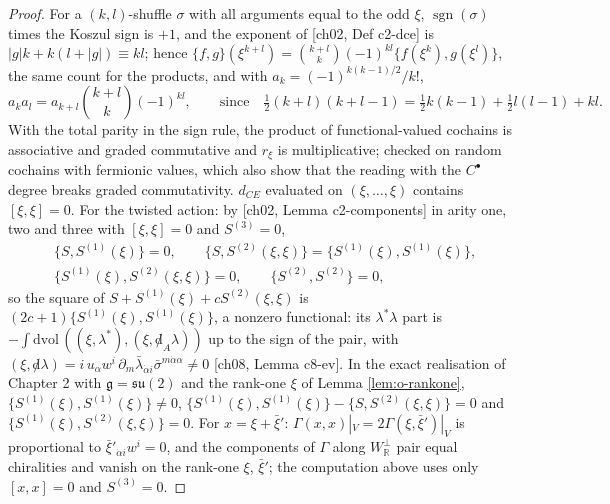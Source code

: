 \begin{proof}
For a $(k,l)$-shuffle $\sigma$ with all arguments equal to the odd $\xi$, $\operatorname{sgn}(\sigma)$ times the Koszul sign is $+1$, and the exponent of [ch02, Def c2-dce] is $|g|k+k(l+|g|)\equiv kl$; hence $\{f,g\}(\xi^{k+l})=\binom{k+l}{k}(-1)^{kl}\{f(\xi^k),g(\xi^l)\}$, the same count for the products, and with $a_k=(-1)^{k(k-1)/2}/k!$,
\[
a_ka_l=a_{k+l}\binom{k+l}{k}(-1)^{kl},\qquad\text{since}\quad \tfrac12(k+l)(k+l-1)=\tfrac12k(k-1)+\tfrac12l(l-1)+kl .
\]
With the total parity in the sign rule, the product of functional-valued cochains is associative and graded commutative and $r_\xi$ is multiplicative; checked on random cochains with fermionic values, which also show that the reading with the $C^\bullet$ degree breaks graded commutativity. $d_{CE}$ evaluated on $(\xi,\dots,\xi)$ contains $[\xi,\xi]=0$. For the twisted action: by [ch02, Lemma c2-components] in arity one, two and three with $[\xi,\xi]=0$ and $S^{(3)}=0$,
\[
\begin{aligned}
&\{S,S^{(1)}(\xi)\}=0,\qquad \{S,S^{(2)}(\xi,\xi)\}=\{S^{(1)}(\xi),S^{(1)}(\xi)\},\\
&\{S^{(1)}(\xi),S^{(2)}(\xi,\xi)\}=0,\qquad \{S^{(2)},S^{(2)}\}=0,
\end{aligned}
\]
so the square of $S+S^{(1)}(\xi)+cS^{(2)}(\xi,\xi)$ is $(2c+1)\{S^{(1)}(\xi),S^{(1)}(\xi)\}$, a nonzero functional: its $\lambda^*\lambda$ part is $-\int\mathrm{dvol}\,((\xi,\lambda^*),(\xi,{\not d}_A\lambda))$ up to the sign of the pair, with $(\xi,{\not d}\lambda)=i\,u_\alpha w^i\,\partial_m\bar\lambda_{\dot\alpha i}\bar\sigma^{m\dot\alpha\alpha}\neq0$ [ch08, Lemma c8-ev]. In the exact realisation of Chapter 2 with $\mathfrak g=\mathfrak{su}(2)$ and the rank-one $\xi$ of Lemma \ref{lem:o-rankone}, $\{S^{(1)}(\xi),S^{(1)}(\xi)\}\neq0$, $\{S^{(1)}(\xi),S^{(1)}(\xi)\}-\{S,S^{(2)}(\xi,\xi)\}=0$ and $\{S^{(1)}(\xi),S^{(2)}(\xi,\xi)\}=0$. For $x=\xi+\bar\xi'$: $\Gamma(x,x)|_V=2\Gamma(\xi,\bar\xi')|_V$ is proportional to $\bar\xi'_{\dot\alpha i}w^i=0$, and the components of $\Gamma$ along $W_{\mathbb R}^\perp$ pair equal chiralities and vanish on the rank-one $\xi$, $\bar\xi'$; the computation above uses only $[x,x]=0$ and $S^{(3)}=0$.
\end{proof}

